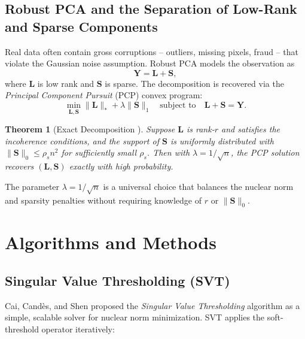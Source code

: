 \documentclass[conference]{IEEEtran}
\newtheorem{theorem}{Theorem}
\begin{document}
\subsection{Robust PCA and the Separation of Low-Rank and Sparse Components}

Real data often contain gross corruptions -- outliers, missing pixels, fraud -- that violate the Gaussian noise assumption. Robust PCA \cite{candes2011robust,wright2009robust} models the observation as
\begin{equation}
  \mathbf{Y} = \mathbf{L} + \mathbf{S},
  \label{eq:rpca}
\end{equation}
where $\mathbf{L}$ is low rank and $\mathbf{S}$ is sparse. The decomposition is recovered via the \emph{Principal Component Pursuit} (PCP) convex program:
\begin{equation}
  \min_{\mathbf{L}, \mathbf{S}} \|\mathbf{L}\|_* + \lambda \|\mathbf{S}\|_1
  \quad \text{subject to} \quad \mathbf{L} + \mathbf{S} = \mathbf{Y}.
  \label{eq:pcp}
\end{equation}

\begin{theorem}[Exact Decomposition \cite{candes2011robust}]
  Suppose $\mathbf{L}$ is rank-$r$ and satisfies the incoherence conditions, and the support of $\mathbf{S}$ is uniformly distributed with $\|\mathbf{S}\|_0 \leq \rho_s n^2$ for sufficiently small $\rho_s$. Then with $\lambda = 1/\sqrt{n}$, the PCP solution recovers $(\mathbf{L}, \mathbf{S})$ exactly with high probability.
\end{theorem}

The parameter $\lambda = 1/\sqrt{n}$ is a universal choice that balances the nuclear norm and sparsity penalties without requiring knowledge of $r$ or $\|\mathbf{S}\|_0$.

\section{Algorithms and Methods}
\label{sec:algorithms}

\subsection{Singular Value Thresholding (SVT)}

Cai, Cand\`{e}s, and Shen \cite{cai2010singular} proposed the \emph{Singular Value Thresholding} algorithm as a simple, scalable solver for nuclear norm minimization. SVT applies the soft-threshold operator iteratively:
\end{document}
